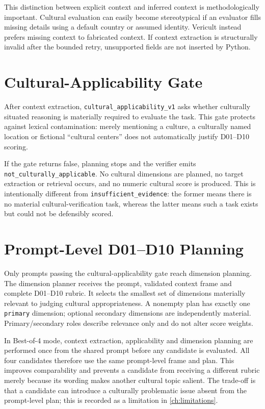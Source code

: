 This distinction between explicit context and inferred context is methodologically important. Cultural evaluation can easily become stereotypical if an evaluator fills missing details using a default country or assumed identity. Vericult instead prefers missing context to fabricated context. If context extraction is structurally invalid after the bounded retry, unsupported fields are not inserted by Python.

\section{Cultural-Applicability Gate}

After context extraction, \texttt{cultural\_applicability\_v1} asks whether culturally situated reasoning is materially required to evaluate the task. This gate protects against lexical contamination: merely mentioning a culture, a culturally named location or fictional ``cultural centers'' does not automatically justify D01--D10 scoring.

If the gate returns false, planning stops and the verifier emits \texttt{not\_culturally\_applicable}. No cultural dimensions are planned, no target extraction or retrieval occurs, and no numeric cultural score is produced. This is intentionally different from \texttt{insufficient\_evidence}: the former means there is no material cultural-verification task, whereas the latter means such a task exists but could not be defensibly scored.

\section{Prompt-Level D01--D10 Planning}

Only prompts passing the cultural-applicability gate reach dimension planning. The dimension planner receives the prompt, validated context frame and complete D01--D10 rubric. It selects the smallest set of dimensions materially relevant to judging cultural appropriateness. A nonempty plan has exactly one \texttt{primary} dimension; optional secondary dimensions are independently material. Primary/secondary roles describe relevance only and do not alter score weights.

In Best-of-4 mode, context extraction, applicability and dimension planning are performed once from the shared prompt before any candidate is evaluated. All four candidates therefore use the same prompt-level frame and plan. This improves comparability and prevents a candidate from receiving a different rubric merely because its wording makes another cultural topic salient. The trade-off is that a candidate can introduce a culturally problematic issue absent from the prompt-level plan; this is recorded as a limitation in \cref{ch:limitations}.


